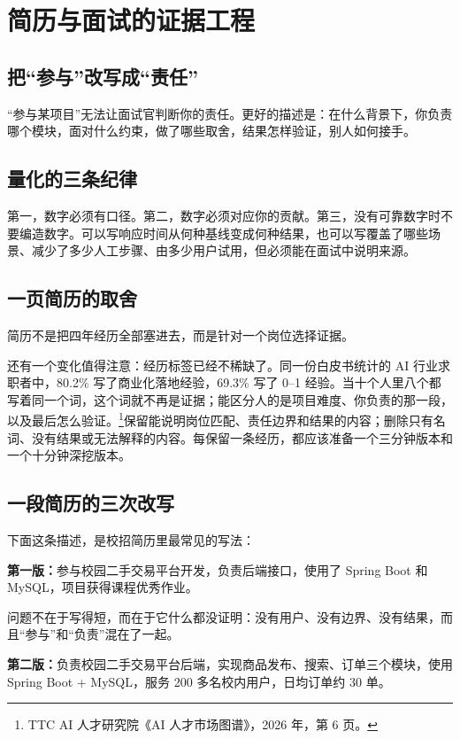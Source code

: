 \documentclass[UTF8,zihao=5,openany]{ctexbook}
\begin{document}
\chapter{简历与面试的证据工程}
\section{把“参与”改写成“责任”}
“参与某项目”无法让面试官判断你的责任。更好的描述是：在什么背景下，你负责哪个模块，面对什么约束，做了哪些取舍，结果怎样验证，别人如何接手。

\section{量化的三条纪律}
第一，数字必须有口径。第二，数字必须对应你的贡献。第三，没有可靠数字时不要编造数字。可以写响应时间从何种基线变成何种结果，也可以写覆盖了哪些场景、减少了多少人工步骤、由多少用户试用，但必须能在面试中说明来源。

\section{一页简历的取舍}
简历不是把四年经历全部塞进去，而是针对一个岗位选择证据。

还有一个变化值得注意：经历标签已经不稀缺了。同一份白皮书统计的 AI 行业求职者中，80.2\% 写了商业化落地经验，69.3\% 写了 0--1 经验。当十个人里八个都写着同一个词，这个词就不再是证据；能区分人的是项目难度、你负责的那一段，以及最后怎么验证。\footnote{TTC AI 人才研究院《AI 人才市场图谱》，2026 年，第 6 页。}保留能说明岗位匹配、责任边界和结果的内容；删除只有名词、没有结果或无法解释的内容。每保留一条经历，都应该准备一个三分钟版本和一个十分钟深挖版本。

\section{一段简历的三次改写}
下面这条描述，是校招简历里最常见的写法：

\begin{casebox}
\textbf{第一版：}参与校园二手交易平台开发，负责后端接口，使用了 Spring Boot 和 MySQL，项目获得课程优秀作业。
\end{casebox}

问题不在于写得短，而在于它什么都没证明：没有用户、没有边界、没有结果，而且“参与”和“负责”混在了一起。

\begin{casebox}
\textbf{第二版：}负责校园二手交易平台后端，实现商品发布、搜索、订单三个模块，使用 Spring Boot + MySQL，服务 200 多名校内用户，日均订单约 30 单。
\end{casebox}
\end{document}
